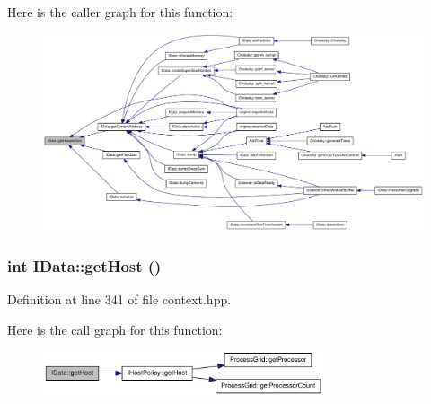 Here is the caller graph for this function:\nopagebreak
\begin{figure}[H]
\begin{center}
\leavevmode
\includegraphics[width=420pt]{class_i_data_acf62b5fb26cf38c5a0b1480f8a548664_icgraph}
\end{center}
\end{figure}
\hypertarget{class_i_data_ae7dd611bb647deae870c56208e58db08}{
\subsubsection[{getHost}]{\setlength{\rightskip}{0pt plus 5cm}int IData::getHost ()}}
\label{class_i_data_ae7dd611bb647deae870c56208e58db08}


Definition at line 341 of file context.hpp.

Here is the call graph for this function:\nopagebreak
\begin{figure}[H]
\begin{center}
\leavevmode
\includegraphics[width=234pt]{class_i_data_ae7dd611bb647deae870c56208e58db08_cgraph}
\end{center}
\end{figure}


